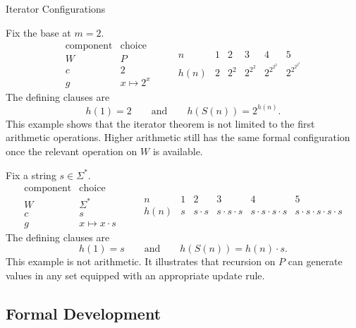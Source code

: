 \begin{topicbox}{Iterator Configurations}
\begin{remark*}
Fix the base at $m=2$.
\[
\begin{array}{c|c}
\text{component} & \text{choice}\\ \hline
W & P\\
c & 2\\
g & x\mapsto 2^x
\end{array}
\qquad
\begin{array}{c|ccccc}
n & 1 & 2 & 3 & 4 & 5\\ \hline
h(n) & 2 & 2^2 & 2^{2^2} & 2^{2^{2^2}} & 2^{2^{2^{2^2}}}
\end{array}
\]
The defining clauses are
\[
h(1)=2
\qquad\text{and}\qquad
h(S(n))=2^{h(n)}.
\]
This example shows that the iterator theorem is not limited to the first
arithmetic operations. Higher arithmetic still has the same formal
configuration once the relevant operation on $W$ is available.
\end{remark*}

\begin{remark*}
Fix a string $s\in \Sigma^*$.
\[
\begin{array}{c|c}
\text{component} & \text{choice}\\ \hline
W & \Sigma^*\\
c & s\\
g & x\mapsto x\cdot s
\end{array}
\qquad
\begin{array}{c|ccccc}
n & 1 & 2 & 3 & 4 & 5\\ \hline
h(n) & s & s\cdot s & s\cdot s\cdot s &
s\cdot s\cdot s\cdot s & s\cdot s\cdot s\cdot s\cdot s
\end{array}
\]
The defining clauses are
\[
h(1)=s
\qquad\text{and}\qquad
h(S(n))=h(n)\cdot s.
\]
This example is not arithmetic. It illustrates that recursion on $P$ can
generate values in any set equipped with an appropriate update rule.
\end{remark*}
\end{topicbox}

\subsection{Formal Development}

